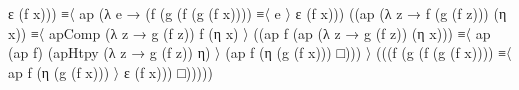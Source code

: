\documentclass[
  11pt,
  oneside,
  article]{memoir}
\newenvironment{Shaded}{}{}
\newcommand{\NormalTok}[1]{#1}
\newcommand{\OtherTok}[1]{\textcolor[rgb]{0.00,0.44,0.13}{#1}}
\theoremstyle{definition}
\theoremstyle{plain}
\newcommand{\0}{\textsf{0}}
\newcommand{\1}{\tn{\textsf{1}}}
\begin{document}
\begin{Shaded}
\begin{Highlighting}[]
\NormalTok{                ε }\OtherTok{(}\NormalTok{f x}\OtherTok{)))}
\NormalTok{              ≡〈 ap }\OtherTok{(λ}\NormalTok{ e }\OtherTok{→} \OtherTok{(}\NormalTok{f }\OtherTok{(}\NormalTok{g }\OtherTok{(}\NormalTok{f }\OtherTok{(}\NormalTok{g }\OtherTok{(}\NormalTok{f x}\OtherTok{))))}\NormalTok{ ≡〈 e 〉 ε }\OtherTok{(}\NormalTok{f x}\OtherTok{)))} 
                    \OtherTok{((}\NormalTok{ap }\OtherTok{(λ}\NormalTok{ z }\OtherTok{→}\NormalTok{ f }\OtherTok{(}\NormalTok{g }\OtherTok{(}\NormalTok{f z}\OtherTok{)))} \OtherTok{(}\NormalTok{η x}\OtherTok{))} 
\NormalTok{                     ≡〈 apComp }\OtherTok{(λ}\NormalTok{ z }\OtherTok{→}\NormalTok{ g }\OtherTok{(}\NormalTok{f z}\OtherTok{))}\NormalTok{ f }\OtherTok{(}\NormalTok{η x}\OtherTok{)}\NormalTok{ 〉 }
                     \OtherTok{((}\NormalTok{ap f }\OtherTok{(}\NormalTok{ap }\OtherTok{(λ}\NormalTok{ z }\OtherTok{→}\NormalTok{ g }\OtherTok{(}\NormalTok{f z}\OtherTok{))} \OtherTok{(}\NormalTok{η x}\OtherTok{)))} 
\NormalTok{                     ≡〈 ap }\OtherTok{(}\NormalTok{ap f}\OtherTok{)} \OtherTok{(}\NormalTok{apHtpy }\OtherTok{(λ}\NormalTok{ z }\OtherTok{→}\NormalTok{ g }\OtherTok{(}\NormalTok{f z}\OtherTok{))}\NormalTok{ η}\OtherTok{)}\NormalTok{ 〉 }
                     \OtherTok{(}\NormalTok{ap f }\OtherTok{(}\NormalTok{η }\OtherTok{(}\NormalTok{g }\OtherTok{(}\NormalTok{f x}\OtherTok{)))}\NormalTok{ □}\OtherTok{)))}\NormalTok{ 〉 }
              \OtherTok{(((}\NormalTok{f }\OtherTok{(}\NormalTok{g }\OtherTok{(}\NormalTok{f }\OtherTok{(}\NormalTok{g }\OtherTok{(}\NormalTok{f x}\OtherTok{))))} 
\NormalTok{                ≡〈 ap f }\OtherTok{(}\NormalTok{η }\OtherTok{(}\NormalTok{g }\OtherTok{(}\NormalTok{f x}\OtherTok{)))}\NormalTok{ 〉}
\NormalTok{                ε }\OtherTok{(}\NormalTok{f x}\OtherTok{)))}\NormalTok{ □}\OtherTok{)))))}


\end{Highlighting}
\end{Shaded}
\end{document}
